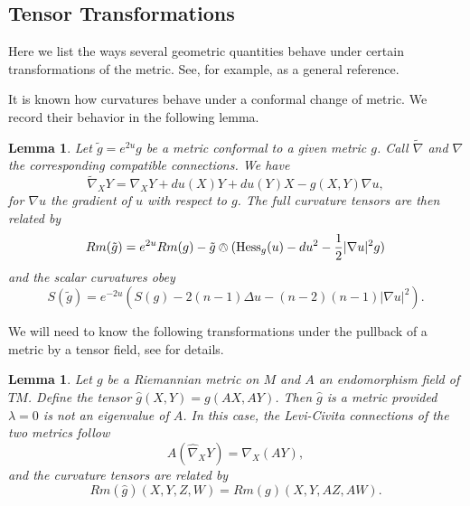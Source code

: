 \documentclass{amsart}
\newtheorem{lem}[thm]{Lemma}
\begin{document}
\subsection{Tensor Transformations}

Here we list the ways several geometric quantities behave under certain transformations of the metric.
See, for example, \cite{Lee2018} as a general reference.

It is known how curvatures behave under a conformal change of metric.
We record their behavior in the following lemma.


\begin{lem}
\label{ConfChange}
Let $\tilde{g} = e^{2u}g$ be a metric conformal to a given metric $g$.
Call $\widetilde{\nabla}$ and $\nabla$ the corresponding compatible connections.
We have 
\[
\widetilde{\nabla}_XY = \nabla_XY + du(X)Y + du(Y)X - g(X,Y)\nabla u,
\]
for $\nabla u$ the gradient of $u$ with respect to $g$.
The full curvature tensors are then related by
\[
Rm(\tilde{g}) = e^{2u}Rm(g) - \tilde{g}\owedge(\mathrm{Hess}_g(u) - du^2 - \frac{1}{2}|\nabla u|^2g)
\]
and the scalar curvatures obey
\[
S(\tilde{g}) = e^{-2u}(S(g) -2(n-1)\Delta u  - (n-2)(n-1)|\nabla u|^2).
\]
\end{lem}

We will need to know the following transformations under the pullback of a metric by a tensor field, see \cite{Bridgeman-Bromberg2022} for details.

\begin{lem}
\label{TensorChange}
Let $g$ be a Riemannian metric on $M$ and $A$ an endomorphism field of $TM$.
Define the tensor $\hat{g}(X,Y) = g(AX,AY)$.
Then $\hat{g}$ is a metric provided $\lambda = 0$ is not an eigenvalue of $A$. 
In this case, the Levi-Civita connections of the two metrics follow
\[
A (\widehat{\nabla}_XY) = \nabla_X(AY),
\]
and the curvature tensors are related by 
\[
Rm(\hat{g})(X,Y,Z,W) = Rm(g)(X,Y,AZ,AW).
\]
\end{lem}
\end{document}
